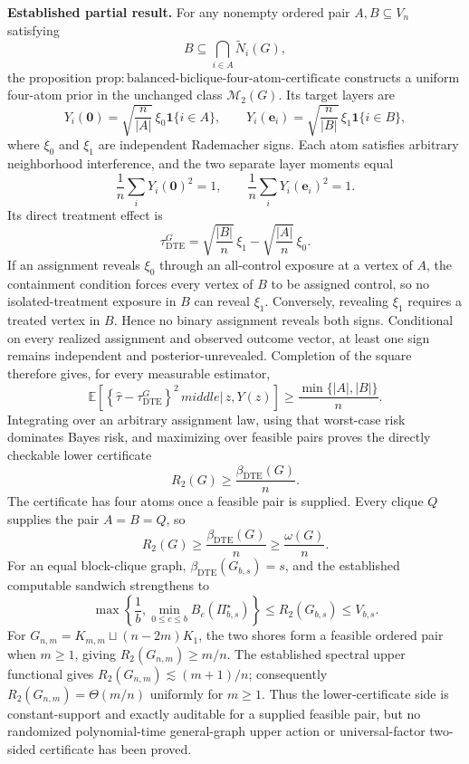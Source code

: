 \textbf{Established partial result.}
For any nonempty ordered pair \(A,B\subseteq V_n\) satisfying
\[
B\subseteq\bigcap_{i\in A}\widetilde N_i(G),
\]
the proposition \(\mathrm{prop{:}balanced\text{-}biclique\text{-}four\text{-}atom\text{-}certificate}\) constructs a uniform four-atom prior in the unchanged class \(\mathcal M_2(G)\).  Its target layers are
\[
Y_i(\mathbf 0)=\sqrt{\frac{n}{|A|}}\,\xi_0\mathbf 1\{i\in A\},
\qquad
Y_i(\mathbf e_i)=\sqrt{\frac{n}{|B|}}\,\xi_1\mathbf 1\{i\in B\},
\]
where \(\xi_0\) and \(\xi_1\) are independent Rademacher signs.  Each atom satisfies arbitrary neighborhood interference, and the two separate layer moments equal
\[
\frac1n\sum_iY_i(\mathbf0)^2=1,
\qquad
\frac1n\sum_iY_i(\mathbf e_i)^2=1.
\]
Its direct treatment effect is
\[
\tau_{\mathrm{DTE}}^G
=
\sqrt{\frac{|B|}{n}}\,\xi_1
-
\sqrt{\frac{|A|}{n}}\,\xi_0.
\]
If an assignment reveals \(\xi_0\) through an all-control exposure at a vertex of \(A\), the containment condition forces every vertex of \(B\) to be assigned control, so no isolated-treatment exposure in \(B\) can reveal \(\xi_1\).  Conversely, revealing \(\xi_1\) requires a treated vertex in \(B\).  Hence no binary assignment reveals both signs.  Conditional on every realized assignment and observed outcome vector, at least one sign remains independent and posterior-unrevealed.  Completion of the square therefore gives, for every measurable estimator,
\[
\mathbb E\!\left[
\left\{\widehat\tau-\tau_{\mathrm{DTE}}^G\right\}^2
\,middle|\,z,Y(z)
\right]
\geq
\frac{\min\{|A|,|B|\}}{n}.
\]
Integrating over an arbitrary assignment law, using that worst-case risk dominates Bayes risk, and maximizing over feasible pairs proves the directly checkable lower certificate
\[
R_2(G)\geq\frac{\beta_{\mathrm{DTE}}(G)}{n}.
\]
The certificate has four atoms once a feasible pair is supplied.  Every clique \(Q\) supplies the pair \(A=B=Q\), so
\[
R_2(G)\geq\frac{\beta_{\mathrm{DTE}}(G)}n
\geq\frac{\omega(G)}n.
\]
For an equal block-clique graph, \(\beta_{\mathrm{DTE}}(G_{b,s})=s\), and the established computable sandwich strengthens to
\[
\max\left\{
\frac1b,
\min_{0\leq c\leq b}B_c(\Pi_{b,s}^{\star})
\right\}
\leq R_2(G_{b,s})\leq V_{b,s}.
\]
For \(G_{n,m}=K_{m,m}\sqcup(n-2m)K_1\), the two shores form a feasible ordered pair when \(m\geq1\), giving \(R_2(G_{n,m})\geq m/n\).  The established spectral upper functional gives \(R_2(G_{n,m})\lesssim(m+1)/n\); consequently \(R_2(G_{n,m})=\Theta(m/n)\) uniformly for \(m\geq1\).  Thus the lower-certificate side is constant-support and exactly auditable for a supplied feasible pair, but no randomized polynomial-time general-graph upper action or universal-factor two-sided certificate has been proved.